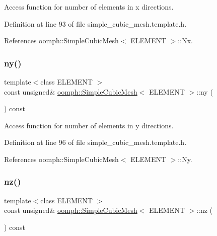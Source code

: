 Access function for number of elements in x directions. 



Definition at line 93 of file simple\+\_\+cubic\+\_\+mesh.\+template.\+h.



References oomph\+::\+Simple\+Cubic\+Mesh$<$ E\+L\+E\+M\+E\+N\+T $>$\+::\+Nx.

\mbox{\label{classoomph_1_1SimpleCubicMesh_a16979ec3b0e88fb37730415190021c1c}} 
\subsubsection{\texorpdfstring{ny()}{ny()}}
{\footnotesize\ttfamily template$<$class E\+L\+E\+M\+E\+NT $>$ \\
const unsigned\& \hyperlink{classoomph_1_1SimpleCubicMesh}{oomph\+::\+Simple\+Cubic\+Mesh}$<$ E\+L\+E\+M\+E\+NT $>$\+::ny (\begin{DoxyParamCaption}{ }\end{DoxyParamCaption}) const\hspace{0.3cm}{\ttfamily [inline]}}



Access function for number of elements in y directions. 



Definition at line 96 of file simple\+\_\+cubic\+\_\+mesh.\+template.\+h.



References oomph\+::\+Simple\+Cubic\+Mesh$<$ E\+L\+E\+M\+E\+N\+T $>$\+::\+Ny.

\mbox{\label{classoomph_1_1SimpleCubicMesh_ad78725440e4e87598fd9339653b28e61}} 
\subsubsection{\texorpdfstring{nz()}{nz()}}
{\footnotesize\ttfamily template$<$class E\+L\+E\+M\+E\+NT $>$ \\
const unsigned\& \hyperlink{classoomph_1_1SimpleCubicMesh}{oomph\+::\+Simple\+Cubic\+Mesh}$<$ E\+L\+E\+M\+E\+NT $>$\+::nz (\begin{DoxyParamCaption}{ }\end{DoxyParamCaption}) const\hspace{0.3cm}{\ttfamily [inline]}}



